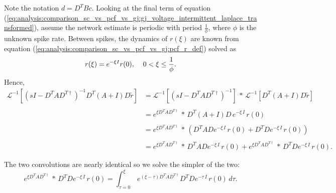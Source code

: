 Note the notation $d = D^T B c$. 
Looking at the final term of equation (\ref{eq:analysis:comparison_sc_vs_pcf_vs_gj:gj_voltage_intermittent_laplace_transformed}), assume the network estimate is periodic with period $\frac{1}{\phi}$, where $\phi$ is the unknown spike rate. Between spikes, the dynamics of $r(\xi)$ are known from equation (\ref{eq:analysis:comparison_sc_vs_pcf_vs_gj:pcf_r_def}) solved as
$$
	r(\xi) = e^{-\xi I} r(0), \hspace{4mm} 0 < \xi \leq  \frac{1}{\phi}.
$$
Hence, 
\begin{align*}
	\mathcal{L}^{-1}
	\left[
		\left(
			sI - D^T A D^{T \dagger}
		\right)^{-1}
		D^T 
		\left(
			A + I
		\right)	
		D \tilde{r}
	\right]
	&= 
	\mathcal{L}^{-1}
	\left[
		\left(
			sI - D^T A D^{T \dagger}
		\right)^{-1}		
	\right]
	\, 
	*	
	\,
	\mathcal{L}^{-1}
	\left[
		D^T 
		\left(
			A + I
		\right)	
		D \tilde{r}
	\right]
	\\
	\\
	&=
	e^{\xi D^T A D^{T \dagger}}
	\, 
	*	
	\,
		D^T 
		\left(
			A + I
		\right)	
		D \, 
		e^{-\xi \, I} \, r(0)		
	\\
	\\
	&= 	e^{\xi D^T A D^{T \dagger}}
	\, 
	*	
	\,
	\left(
		D^T A D e^{-\xi \, I} \, r(0)
		+
		D^T D e^{-\xi \, I} \, r(0)
	\right)	
	\\
	\\
	&=
	e^{\xi D^T A D^{T \dagger}}
	\, 	*  \,
	D^T A D e^{-\xi \, I} \, r(0)	
	+
	e^{\xi D^T A D^{T \dagger}}
	\, 	*  \,
	D^T D e^{-\xi \, I} \, r(0).	
\end{align*}

The two convolutions are nearly identical so we solve the simpler of the two:
\\
$$
	e^{\xi D^T A D^{T \dagger}}
	\, 	*  \,
	D^T D e^{-\xi \, I} \, r(0)
	= 
	\int_{\tau=0}^{\xi} \,
		e^{ \left(\xi-\tau\right) D^T A D^{T \dagger}}
		D^T D e^{-\tau \, I} \, r(0)
		\, d\tau.
$$

